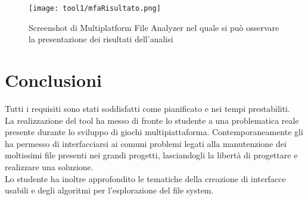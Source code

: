 	\begin{figure}[!h] 
		\centering 
		\texttt{[image: tool1/mfaRisultato.png]} 
		\caption{Screenshot di Multiplatform File Analyzer nel quale si può osservare la presentazione dei risultati dell'analisi}
	\end{figure}
	
\section{Conclusioni}
	Tutti i requisiti sono stati soddisfatti come pianificato e nei tempi prestabiliti.\\
	La realizzazione del tool ha messo di fronte lo studente a una problematica reale presente durante lo sviluppo di giochi multipiattaforma. Contemporaneamente gli ha permesso di interfacciarsi ai comuni problemi legati alla manutenzione dei moltissimi file presenti nei grandi progetti, lasciandogli la libertà di progettare e realizzare una soluzione.\\
	Lo studente ha inoltre approfondito le tematiche della creazione di interfacce usabili e degli algoritmi per l'esplorazione del file system.